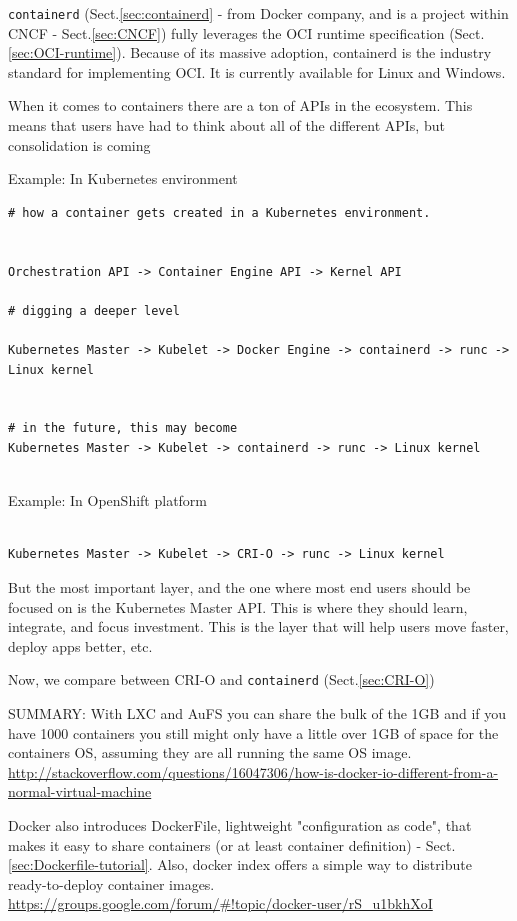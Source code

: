 \verb!containerd! (Sect.\ref{sec:containerd} - from Docker company, and is a
project within CNCF - Sect.\ref{sec:CNCF}) fully leverages the OCI runtime
specification (Sect.\ref{sec:OCI-runtime}). Because of its massive adoption,
containerd is the industry standard for implementing OCI. It is currently
available for Linux and Windows.

 
When it comes to containers there are a ton of APIs in the ecosystem.
This means that users have had to think about all of the different APIs, but consolidation is coming

Example:  In Kubernetes environment
\begin{verbatim}
# how a container gets created in a Kubernetes environment. 
 
 
Orchestration API -> Container Engine API -> Kernel API

# digging a deeper level

Kubernetes Master -> Kubelet -> Docker Engine -> containerd -> runc -> Linux kernel


# in the future, this may become
Kubernetes Master -> Kubelet -> containerd -> runc -> Linux kernel


\end{verbatim}
Example: In OpenShift platform
\begin{verbatim}

Kubernetes Master -> Kubelet -> CRI-O -> runc -> Linux kernel

\end{verbatim}

But the most important layer, and the one where most end users should be focused
on is the Kubernetes Master API. This is where they should learn, integrate, and
focus investment. This is the layer that will help users move faster, deploy
apps better, etc.


Now, we compare between CRI-O and \verb!containerd! (Sect.\ref{sec:CRI-O})




SUMMARY: With LXC and AuFS you can share the bulk of the 1GB and if you have
1000 containers you still might only have a little over 1GB of space for the
containers OS, assuming they are all running the same OS image.   
\url{http://stackoverflow.com/questions/16047306/how-is-docker-io-different-from-a-normal-virtual-machine}

Docker also introduces DockerFile, lightweight "configuration as code", that
makes it easy to share containers (or at least container definition) -
Sect.\ref{sec:Dockerfile-tutorial}.
Also, docker index offers a simple way to distribute ready-to-deploy container
images. \url{https://groups.google.com/forum/\#!topic/docker-user/rS_u1bkhXoI}


